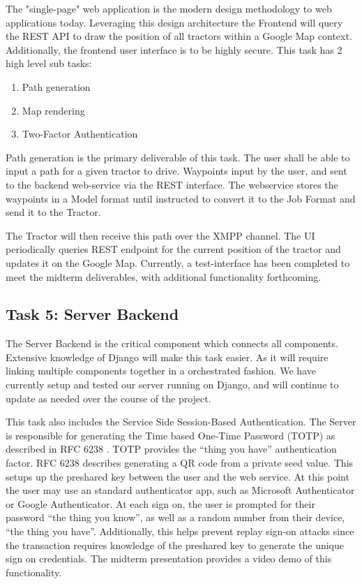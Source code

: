 \documentclass[conference,12pt]{IEEEtran}
\begin{document}
The "single-page" web application is the modern design methodology to web
applications
today. Leveraging this design architecture the Frontend will query the REST API
to draw the position of all tractors within a Google Map context. Additionally, 
the frontend user interface is to be highly secure. This task has
2 high level sub tasks:

\begin{enumerate}
\item Path generation
\item Map rendering
\item Two-Factor Authentication
\end{enumerate}

Path generation is the primary deliverable of this task. The user shall be able
to input a path for a given tractor to drive. Waypoints  input by
the user, and sent to the backend web-service via the REST interface. The
webservice stores the waypoints in a Model format until instructed to convert it
to the Job Format and send it to the Tractor.

The Tractor will then receive this
path over the XMPP channel.  The UI periodically queries REST endpoint for the
current 
position of the tractor and updates it on the Google Map. Currently,
a test-interface has been completed to meet the midterm deliverables, with
additional functionality forthcoming.

\subsection{Task 5: Server Backend}
The Server Backend is the critical component which connects all components.
Extensive knowledge of Django will make this task easier. As it will require
linking multiple components together in a orchestrated fashion. We have
currently setup and tested our server running on Django, and will continue to
update as needed over the course of the project. 

This task also includes the Service Side Session-Based Authentication. The
Server is responsible for generating the Time based One-Time Password (TOTP) as described in RFC 6238
\autocite{rydell_totp_2011}.  TOTP provides the ``thing you have''
authentication factor. RFC 6238 describes generating a QR code from a private
seed value. This setups up the preshared key between the user and the web
service. At this point the user may use an standard authenticator app, such as
Microsoft Authenticator or Google Authenticator. At each sign on, the user is
prompted for their password ``the thing you know'', as well as a random number
from their device, ``the thing you have''.  Additionally, this helps prevent
replay sign-on attacks since the transaction requires knowledge of the
preshared key to generate the unique sign on credentials. The midterm
presentation provides a video demo of this functionality.
\end{document}
